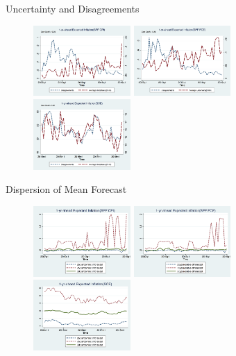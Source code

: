 \documentclass{beamer}
\begin{document}
\begin{frame}{Uncertainty and Disagreements}
\begin{figure}
	\centering
\label{DisgVar}
\includegraphics[width=0.33\textwidth]{figuresDraft/CPI_disg_varSPFCPIQ.png}
\includegraphics[width=0.33\textwidth]{figuresDraft/PCE_disg_varSPFPCEQ.png}
\includegraphics[width=0.33\textwidth]{figuresDraft/Q9_disg_varSCEM.png}
\end{figure}
\end{frame}



\begin{frame}{Dispersion of Mean Forecast}
\begin{figure}
	\includegraphics[width=0.33\textwidth]{figuresDraft/IQRmeanCPIQ.png} 
\smallskip
\includegraphics[width=0.33\textwidth]{figuresDraft/IQRmeanPCEQ.png}
\smallskip
\includegraphics[width=0.33\textwidth]{figuresDraft/IQRmeanSCEM.png}
\end{figure}
\end{frame}
\end{document}
